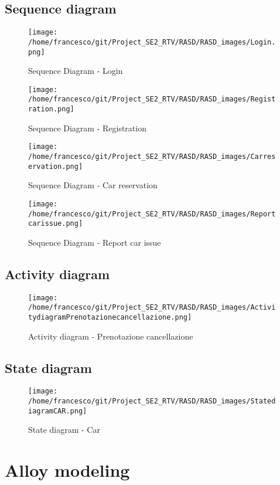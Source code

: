 \documentclass[10pt, a4paper,titlepage]{article}
\begin{document}
\subsection{Sequence diagram}
\begin{figure}[!h]
\texttt{[image: /home/francesco/git/Project\_SE2\_RTV/RASD/RASD\_images/Login.png]}
\caption{Sequence Diagram - Login}
\label{fig:Sequence Diagram - Login}
\end{figure}
\clearpage
\begin{figure}[!h]
\texttt{[image: /home/francesco/git/Project\_SE2\_RTV/RASD/RASD\_images/Registration.png]}
\caption{Sequence Diagram - Registration}
\label{fig:Sequence Diagram - Registration}
\end{figure}
\clearpage
\begin{figure}[!h]
\texttt{[image: /home/francesco/git/Project\_SE2\_RTV/RASD/RASD\_images/Carreservation.png]}
\caption{Sequence Diagram - Car reservation}
\label{fig:Sequence Diagram - Car reservation}
\end{figure}
\clearpage
\begin{figure}[!h]
\texttt{[image: /home/francesco/git/Project\_SE2\_RTV/RASD/RASD\_images/Reportcarissue.png]}
\caption{Sequence Diagram - Report car issue}
\label{fig:Sequence Diagram - Report car issue}
\end{figure}
\clearpage
\subsection{Activity diagram}
\begin{figure}[!h]
\texttt{[image: /home/francesco/git/Project\_SE2\_RTV/RASD/RASD\_images/ActivitydiagramPrenotazionecancellazione.png]}
\caption{Activity diagram - Prenotazione cancellazione}
\label{fig:Activity diagram - Prenotazione cancellazione}
\end{figure}
\clearpage
\subsection{State diagram}
\begin{figure}[!h]
\texttt{[image: /home/francesco/git/Project\_SE2\_RTV/RASD/RASD\_images/StatediagramCAR.png]}
\caption{State diagram - Car}
\label{fig:State diagram - Car}
\end{figure}
\clearpage
\section{Alloy modeling}
\end{document}
